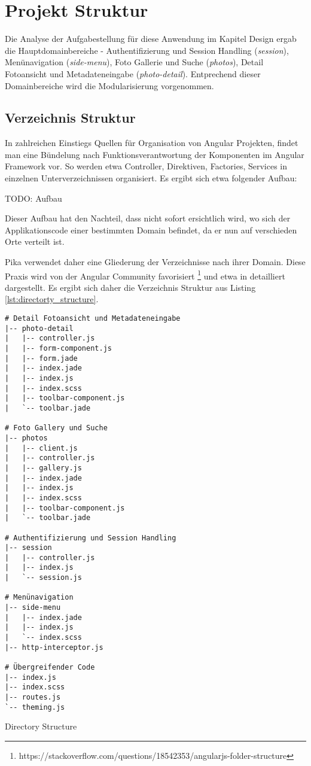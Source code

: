\section{Projekt Struktur}
\label{sec:project_structure}

Die Analyse der Aufgabestellung für diese Anwendung im Kapitel Design ergab die Hauptdomainbereiche -  Authentifizierung und Session Handling (\textit{session}), Menünavigation (\textit{side-menu}), Foto Gallerie und Suche (\textit{photos}), Detail Fotoansicht und Metadateneingabe (\textit{photo-detail}). Entprechend dieser Domainbereiche wird die Modularisierung vorgenommen.

\subsection{Verzeichnis Struktur}

In zahlreichen Einstiegs Quellen für Organisation von Angular Projekten, findet man eine Bündelung nach Funktionsverantwortung der Komponenten im Angular Framework vor. So werden etwa Controller, Direktiven, Factories, Services in einzelnen Unterverzeichnissen organisiert. Es ergibt sich etwa folgender Aufbau:

TODO: Aufbau

Dieser Aufbau hat den Nachteil, dass nicht sofort ersichtlich wird, wo sich der Applikationscode einer bestimmten Domain befindet, da er nun auf verschieden Orte verteilt ist. 

Pika verwendet daher eine Gliederung der Verzeichnisse nach ihrer Domain. Diese Praxis wird von der Angular Community favorisiert \footnote{https://stackoverflow.com/questions/18542353/angularjs-folder-structure} und etwa in \cite{Kukic:2014} detailliert dargestellt. Es ergibt sich daher die Verzeichnis Struktur aus Listing \ref{lst:directorty_structure}.


\begin{listing}[H]
\begin{verbatim}
# Detail Fotoansicht und Metadateneingabe 
|-- photo-detail 
|   |-- controller.js
|   |-- form-component.js
|   |-- form.jade
|   |-- index.jade
|   |-- index.js
|   |-- index.scss
|   |-- toolbar-component.js
|   `-- toolbar.jade

# Foto Gallery und Suche
|-- photos
|   |-- client.js
|   |-- controller.js
|   |-- gallery.js
|   |-- index.jade
|   |-- index.js
|   |-- index.scss
|   |-- toolbar-component.js
|   `-- toolbar.jade

# Authentifizierung und Session Handling
|-- session
|   |-- controller.js
|   |-- index.js
|   `-- session.js

# Menünavigation
|-- side-menu
|   |-- index.jade
|   |-- index.js
|   `-- index.scss
|-- http-interceptor.js

# Übergreifender Code
|-- index.js
|-- index.scss
|-- routes.js
`-- theming.js
\end{verbatim}
\caption{Directory Structure}
\label{lst:directorty_structure}
\end{listing}

